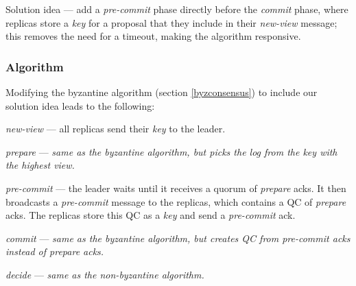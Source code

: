Solution idea --- add a \textit{pre-commit} phase directly before the \textit{commit} phase, where replicas store a \textit{key} for a proposal that they include in their \textit{new-view} message; this removes the need for a timeout, making the algorithm responsive.

\subsubsection{Algorithm}

Modifying the byzantine algorithm (section \ref{byzconsensus}) to include our solution idea leads to the following:

\begin{description}
	\item \textit{new-view} --- all replicas send their \textit{key} to the leader.
	\item \textit{prepare} ---  \textit{same as the byzantine algorithm, but picks the log from the key with the highest view.}
	\item \textit{pre-commit} --- the leader waits until it receives a quorum of \textit{prepare} acks. It then broadcasts a \textit{pre-commit} message to the replicas, which contains a QC of \textit{prepare} acks. The replicas store this QC as a \textit{key} and send a \textit{pre-commit} ack.
	\item \textit{commit} --- \textit{same as the byzantine algorithm, but creates QC from pre-commit acks instead of prepare acks.}
	\item \textit{decide} --- \textit{same as the non-byzantine algorithm.}
\end{description}

